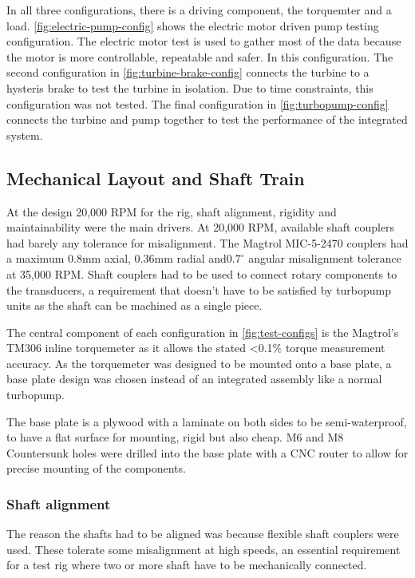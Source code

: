In all three configurations, there is a driving component, the torquemter and a load. \cref{fig:electric-pump-config} shows the electric motor driven pump testing configuration. The electric motor test is used to gather most of the data because the motor is more controllable, repeatable and safer. In this configuration. The second configuration in \cref{fig:turbine-brake-config} connects the turbine to a hysteris brake to test the turbine in isolation. Due to time constraints, this configuration was not tested. The final configuration in \cref{fig:turbopump-config} connects the turbine and pump together to test the performance of the integrated system.

\subsection{Mechanical Layout and Shaft Train}

At the design 20,000 RPM for the rig, shaft alignment, rigidity and maintainability were the main drivers. At 20,000 RPM, available shaft couplers had barely any tolerance for misalignment. The Magtrol MIC-5-2470 couplers had a maximum 0.8mm axial, 0.36mm radial and$0.7^\circ$ angular misalignment tolerance at 35,000 RPM. Shaft couplers had to be used to connect rotary components to the transducers, a requirement that doesn't have to be satisfied by turbopump units as the shaft can be machined as a single piece.

The central component of each configuration in \cref{fig:test-configs} is the Magtrol's TM306 inline torquemeter as it allows the stated <0.1\% torque measurement accuracy. As the torquemeter was designed to be mounted onto a base plate, a base plate design was chosen instead of an integrated assembly like a normal turbopump.

The base plate is a \valRigBaseplateThk plywood with a laminate on both sides to be semi-waterproof, to have a flat surface for mounting, rigid but also cheap. M6 and M8 Countersunk holes were drilled into the base plate with a CNC router to allow for precise mounting of the components. 

\subsubsection{Shaft alignment}

The reason the shafts had to be aligned was because flexible shaft couplers were used. These tolerate some misalignment at high speeds, an essential requirement for a test rig where two or more shaft have to be mechanically connected.

